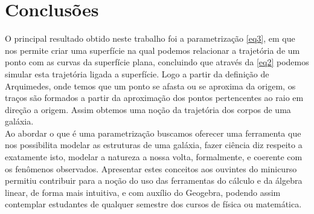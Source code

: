 \documentclass[twoside,a4paper,10pt]{article}
\begin{document}
\section{Conclusões}

O principal resultado obtido neste trabalho foi a parametrização \eqref{eq3}, em que nos permite criar uma superfície na qual podemos relacionar a trajetória de um ponto com as curvas da superfície plana, concluindo que através da \eqref{eq2} podemos simular esta trajetória ligada a superfície. Logo a partir da definição de Arquimedes, onde temos que um ponto se afasta ou se aproxima da origem, os traços são formados a partir da aproximação dos pontos pertencentes ao raio em direção a origem. Assim obtemos uma noção da trajetória dos corpos de uma galáxia.\\
Ao abordar o que é uma parametrização buscamos oferecer uma ferramenta que nos possibilita modelar as estruturas de uma galáxia, fazer ciência diz respeito a exatamente isto, modelar a natureza a nossa volta, formalmente, e coerente com os fenômenos observados. Apresentar estes conceitos aos ouvintes do minicurso permitiu contribuir para a noção do uso das ferramentas do cálculo e da álgebra linear, de forma mais intuitiva, e com auxílio do Geogebra, podendo assim contemplar estudantes de qualquer semestre dos cursos de física ou matemática.%



\end{document}
